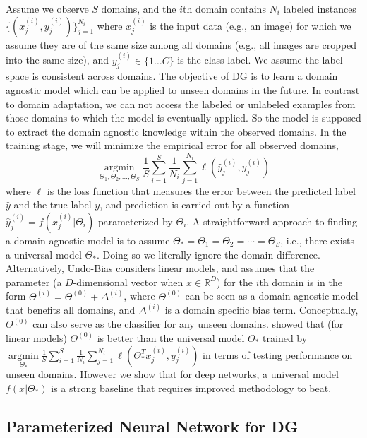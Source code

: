 \documentclass[10pt,twocolumn,letterpaper]{article}
\begin{document}
Assume we observe $S$ domains, and the $i$th domain contains $N_i$ labeled instances  $\{(x_j^{(i)},y_j^{(i)})\}^{N_i}_{j=1}$ where $x_j^{(i)}$ is the input data (e.g., an image) for which we assume they are of the same size among all domains (e.g., all images are cropped into the same size), and $y_j^{(i)}\in \{1\dots C\}$ is the class label. We assume the label space is consistent across domains. The objective of DG is to learn a domain agnostic model which can be applied to unseen domains in the future. In contrast to domain adaptation, we can not access the labeled or unlabeled examples from those domains to which the model is eventually applied. So the model is supposed to extract the domain agnostic knowledge within the observed domains. In the training stage, we will minimize the empirical error for all observed domains,
\begin{equation}
\underset{\Theta_1,\Theta_2,\dots,\Theta_S}{\operatorname{argmin}} \frac{1}{S} \sum^{S}_{i=1}\frac{1}{N_i}\sum^{N_i}_{j=1} \ell(\hat{y}^{(i)}_j,y^{(i)}_j)
\end{equation}
\noindent where $\ell$ is the loss function that measures the error between the predicted label $\hat{y}$ and the true label $y$, and  prediction is carried out by a function $\hat{y}^{(i)}_j = f(x^{(i)}_j | \Theta_i)$ parameterized by $\Theta_i$. A straightforward approach to finding a domain agnostic model is to assume $\Theta_* = \Theta_1 = \Theta_2 = \cdots = \Theta_S$, i.e., there exists a universal model $\Theta_*$. Doing so we literally ignore the domain difference. Alternatively, Undo-Bias \cite{ECCV12_Khosla} considers linear models, and assumes that the parameter (a $D$-dimensional vector when $x\in\mathbb{R}^D$) for the $i$th domain is in the form $\Theta^{(i)}=\Theta^{(0)}+\Delta^{(i)}$, where $\Theta^{(0)}$ can be seen as a domain agnostic model that benefits all domains, and $\Delta^{(i)}$ is a domain specific bias term. Conceptually, $\Theta^{(0)}$ can also serve as the classifier  for any unseen domains. \cite{ECCV12_Khosla} showed that (for linear models) $\Theta^{(0)}$ is better than the universal model $\Theta_*$ trained by $\underset{\Theta_*}{\operatorname{argmin}} \frac{1}{S} \sum^{S}_{i=1}\frac{1}{N_i}\sum^{N_i}_{j=1} \ell(\Theta_*^T x^{(i)}_j,y^{(i)}_j)$ in terms of testing performance on unseen domains. However we show that for deep networks, a universal model $f(x|\Theta_*)$ is a strong baseline that requires improved methodology to beat.

\subsection{Parameterized Neural Network for DG}
\end{document}
